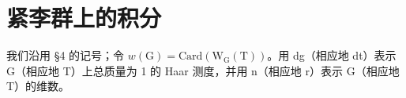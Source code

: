 \section{紧李群上的积分}

我们沿用 §4 的记号；令 \(w(\mathrm{G}) = \mathrm{Card}(\mathrm{W}_{\mathrm{G}}(\mathrm{T}))\)。用 dg（相应地 dt）表示 G（相应地 T）上总质量为 1 的 Haar 测度，并用 n（相应地 r）表示 G（相应地 T）的维数。

